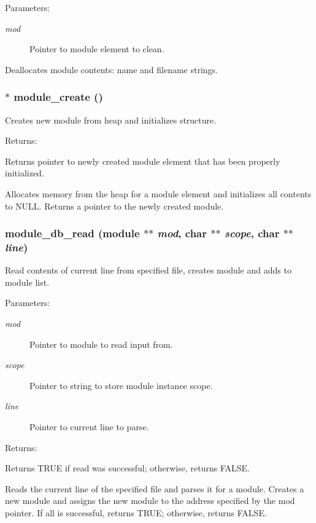 \begin{Desc}
\item[Parameters: ]\par
\begin{description}
\item[{\em 
mod}]Pointer to module element to clean.\end{description}
\end{Desc}
Deallocates module contents: name and filename strings. 
\subsubsection{$\ast$ module\_\-create ()}\label{module_8c_a1}


Creates new module from heap and initializes structure.

\begin{Desc}
\item[Returns: ]\par
Returns pointer to newly created module element that has been properly initialized.\end{Desc}
Allocates memory from the heap for a module element and initializes all contents to NULL. Returns a pointer to the newly created module. 
\subsubsection{ module\_\-db\_\-read ({\bf module} $\ast$$\ast$ {\em mod}, char $\ast$$\ast$ {\em scope}, char $\ast$$\ast$ {\em line})}\label{module_8c_a4}


Read contents of current line from specified file, creates module and adds to module list.

\begin{Desc}
\item[Parameters: ]\par
\begin{description}
\item[{\em 
mod}]Pointer to module to read input from. \item[{\em 
scope}]Pointer to string to store module instance scope. \item[{\em 
line}]Pointer to current line to parse. \end{description}
\end{Desc}
\begin{Desc}
\item[Returns: ]\par
Returns TRUE if read was successful; otherwise, returns FALSE.\end{Desc}
Reads the current line of the specified file and parses it for a module. Creates a new module and assigns the new module to the address specified by the mod pointer. If all is successful, returns TRUE; otherwise, returns FALSE. 
